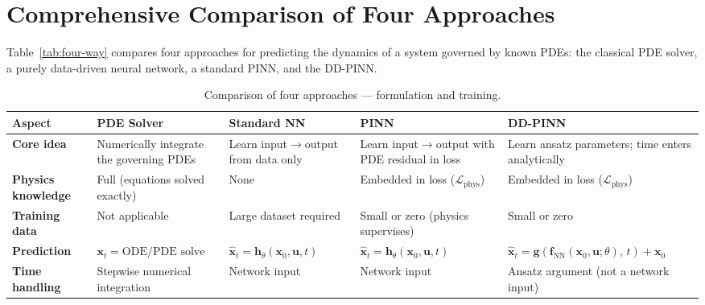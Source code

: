 \documentclass[11pt]{article}
\newcommand{\xhat}{\hat{\bm{x}}}
\newcommand{\uvec}{\bm{u}}
\newcommand{\xvec}{\bm{x}}
\newcommand{\fnn}{\bm{f}_{\mathrm{NN}}}
\begin{document}
\section{Comprehensive Comparison of Four Approaches}
\label{sec:four-way}

Table~\ref{tab:four-way} compares four approaches for predicting the dynamics of a system governed by known PDEs: the classical PDE solver, a purely data-driven neural network, a standard PINN, and the DD-PINN.

\begin{landscape}

\begin{table}[H]
\centering
\caption{Comparison of four approaches --- formulation and training.}
\label{tab:four-way-a}
\footnotesize
\renewcommand{\arraystretch}{1.2}
\begin{tabular}{@{} p{2.8cm} p{4.2cm} p{4.2cm} p{4.2cm} p{4.2cm} @{}}
\toprule
\textbf{Aspect}
    & \textbf{PDE Solver}
    & \textbf{Standard NN}
    & \textbf{PINN}
    & \textbf{DD-PINN} \\
\midrule

\textbf{Core idea}
    & Numerically integrate the governing PDEs
    & Learn input$\to$output from data only
    & Learn input$\to$output with PDE residual in loss
    & Learn ansatz parameters; time enters analytically \\

\textbf{Physics knowledge}
    & Full (equations solved exactly)
    & None
    & Embedded in loss ($\mathcal{L}_{\mathrm{phys}}$)
    & Embedded in loss ($\mathcal{L}_{\mathrm{phys}}$) \\

\textbf{Training data}
    & Not applicable
    & Large dataset required
    & Small or zero (physics supervises)
    & Small or zero \\

\textbf{Prediction}
    & $\xvec_t = \text{ODE/PDE solve}$
    & $\xhat_t = \bm{h}_\theta(\xvec_0, \uvec, t)$
    & $\xhat_t = \bm{h}_\theta(\xvec_0, \uvec, t)$
    & $\xhat_t = \bm{g}(\fnn(\xvec_0,\uvec;\theta),\, t) + \xvec_0$ \\

\textbf{Time handling}
    & Stepwise numerical integration
    & Network input
    & Network input
    & Ansatz argument (not a network input) \\


\end{tabular}
\end{table}
\end{landscape}
\end{document}
